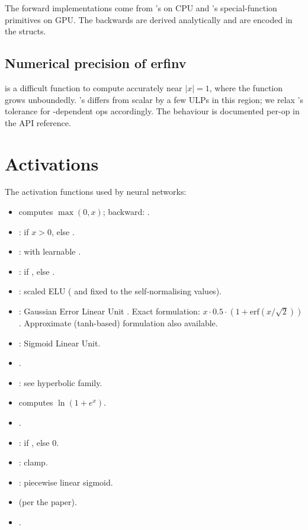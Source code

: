 The forward implementations come from \Accelerate's 
on CPU and \MLX's special-function primitives on GPU. The
backwards are derived analytically and are encoded in the
 structs.

\subsection{Numerical precision of erfinv}
\label{ssec:unary_functions:erfinv_precision}

 is a difficult function to compute accurately near
\(|x| = 1\), where the function grows unboundedly. \vForce's
 differs from scalar  by a few ULPs
in this region; we relax 's tolerance for
-dependent ops accordingly. The behaviour is
documented per-op in the API reference.

\section{Activations}
\label{sec:unary_functions:activations}

The activation functions used by neural networks:

\begin{itemize}
  \item {} computes $\max(0, x)$; backward:
    .
  \item {}:  if
    $x > 0$, else .
  \item {}:  with learnable
    .
  \item {}:  if , else
    .
  \item {}: scaled ELU ( and 
    fixed to the self-normalising values).
  \item {}: Gaussian Error Linear Unit
    \cite{hendrycks_gelu_2016}. Exact
    formulation: $x \cdot 0.5 \cdot (1 + \text{erf}(x / \sqrt{2}))$.
    Approximate (tanh-based) formulation also available.
  \item {}: Sigmoid Linear Unit.
  \item {}.
  \item {}: see hyperbolic family.
  \item {} computes $\ln(1 + e^x)$.
  \item {}.
  \item {}:  if , else 0.
  \item {}: clamp.
  \item {}: piecewise linear sigmoid.
  \item {} (per the
    paper).
  \item {}.
\end{itemize}

